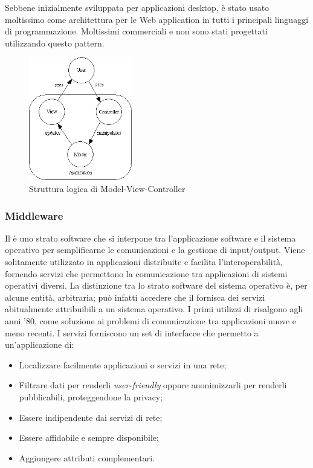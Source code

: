 Sebbene inizialmente sviluppata per applicazioni desktop,  è stato usato moltissimo come architettura per le Web application in tutti i principali linguaggi di programmazione. Moltissimi  commerciali e non sono stati progettati utilizzando questo pattern.

\begin{figure}[H]
\centering \includegraphics[width=0.4\textwidth]{patterns/mvc.png}
\caption{Struttura logica di Model-View-Controller}
\label{fig:mvc}
\end{figure}

\subsubsection{Middleware} 
Il  è uno strato software che si interpone tra l'applicazione software e il sistema operativo per semplificarne le comunicazioni e la gestione di input/output. Viene solitamente utilizzato in applicazioni distribuite e facilita l'interoperabilità, fornendo servizi che permettono la comunicazione tra applicazioni di sistemi operativi diversi. La distinzione tra lo strato software del sistema operativo è, per alcune entità, arbitraria; può infatti accedere che il  fornisca dei servizi abitualmente attribuibili a un sistema operativo. I primi utilizzi di  risalgono agli anni '80, come soluzione ai problemi di comunicazione tra applicazioni nuove e meno recenti. I servizi  forniscono un set di interfacce che permetto a un'applicazione di:
	
\begin{itemize}

	\item Localizzare facilmente applicazioni o servizi in una rete;
	\item Filtrare dati per renderli \textit{user-friendly} oppure anonimizzarli per renderli pubblicabili, proteggendone la privacy;
	\item Essere indipendente dai servizi di rete;
	\item Essere affidabile e sempre disponibile;
	\item Aggiungere attributi complementari.
	
\end{itemize}
	
